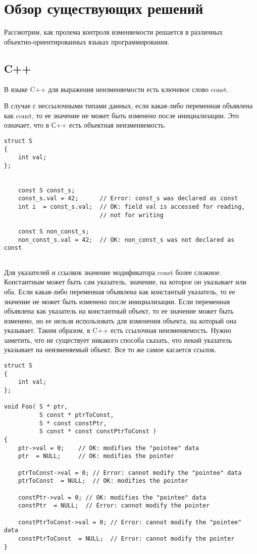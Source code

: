 \section{Обзор существующих решений}

Рассмотрим, как пролема контроля изменяемости решается в различных объектно-ориентированных языках программирования. 

\subsection{C++}

В языке C++ для выражения неизменяемости есть ключевое слово const.

В случае с нессылочными типами данных, если какая-либо переменная объявлена как const, то ее значение не может быть изменено после инициализации. Это означает, что в С++ есть объектная неизменяемость.

\begin{lstlisting}[caption=Константая переменная, label=code:const_var]
struct S
{ 
    int val;
};
 

	const S const_s;
	const_s.val = 42;      // Error: const_s was declared as const
    int i  = const_s.val;  // OK: field val is accessed for reading, 
                           // not for writing

	const S non_const_s;
	non_const_s.val = 42;  // OK: non_const_s was not declared as const
	

\end{lstlisting}

Для указателей и ссылкок значение модификатора const более сложное. Константным может быть сам указатель, значение, на которое он указывает или оба. Если какая-либо переменная объявлена как константый указатель, то ее значение не может быть изменено после инициализации. Если переменная объявлена как указатель на константный объект, то ее значение может быть изменено, но ее нельзя использовать для изменения объекта, на который она указывает. Таким образом, в C++ есть ссылочная неизменяемость. Нужно заметить, что не существует никакого способа сказать, что некий указатель указывает на неизменяемый объект. Все то же самое касается ссылок. 

\begin{lstlisting}[caption=Константный указатель, label=code:const_pointer]
struct S
{ 
    int val;
};

void Foo( S * ptr,
          S const * ptrToConst,
          S * const constPtr,
          S const * const constPtrToConst )
{
    ptr->val = 0;    // OK: modifies the "pointee" data
    ptr  = NULL;     // OK: modifies the pointer
 
    ptrToConst->val = 0; // Error: cannot modify the "pointee" data
    ptrToConst  = NULL;  // OK: modifies the pointer
 
    constPtr->val = 0; // OK: modifies the "pointee" data
    constPtr  = NULL;  // Error: cannot modify the pointer
 
    constPtrToConst->val = 0; // Error: cannot modify the "pointee" data
    constPtrToConst  = NULL;  // Error: cannot modify the pointer
}
\end{lstlisting}

